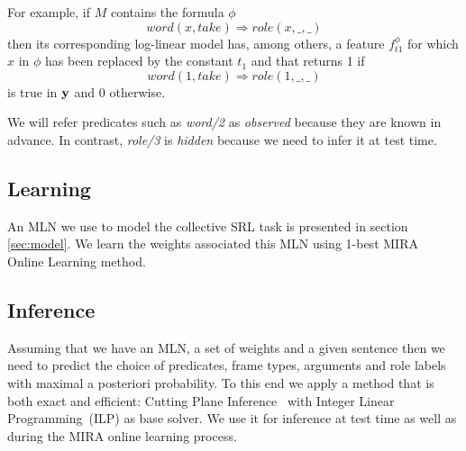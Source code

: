 For example, if $M$ contains the formula $\phi$ \[
word\left(x,take\right)\Rightarrow role\left(x,\_,\_\right)\]
then its corresponding log-linear model has, among others, a feature 
$f_{t1}^{\phi}$ for which $x$ in $\phi$ has been replaced by the constant $t_1$ 
and that returns 1 if \[
word\left(1,take\right) \Rightarrow role\left(1,\_,\_\right)\]
is true in $\mathbf{y}$ and 0 otherwise.

We will refer predicates such as \emph{word/2} as \emph{observed} because they 
are known in advance. In contrast, \emph{role/3} is \emph{hidden} because we 
need to infer it at test time.

\subsection{Learning}

An MLN we use to model the collective SRL task is presented in section 
\ref{sec:model}. We learn the weights associated this MLN using 1-best 
MIRA~\citep{crammer01ultraconservative} Online Learning method. 

\subsection{Inference}

Assuming that we have an MLN, a set of weights and a given sentence then we need 
to predict the choice of predicates, frame types, arguments and role labels with 
maximal a posteriori probability. To this end we apply a method that is both 
exact and efficient: Cutting Plane Inference~\citep[CPI,][]{riedel08improving} 
with Integer Linear Programming~(ILP) as base solver. We use it for inference at 
test time as well as during the MIRA online learning process.

